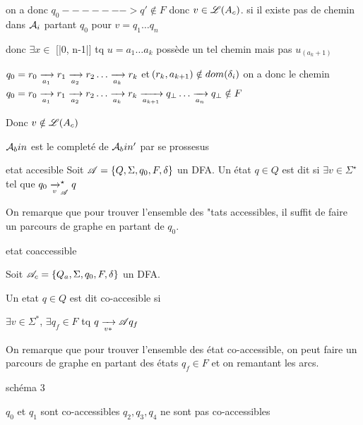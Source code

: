 \begin{nproof}
\begin{enumerate}
            on a donc $q_0 -------> q' \notin F $ donc $v \in \mathscr{L}(A_c)$.
            \itt si il existe pas de chemin dans $\mathcal{A}_i$ partant $q_0$ pour $v=q_1 \dots q_n$
        
        donc $\exists x \in $ [|0, n-1|] tq $u=a_1 \dots a_k$ possède un tel chemin mais pas $u_(a_k+1)$
        \end{enumerate}
        
        $q_0 = r_0 \lima{a_1} r_1 \lima{a_2} r_2 \dots \lima{a_k} r_k$ et $\!\left(r_k, a_{k+1}\right) \notin dom \!\left(\delta_i\right)$
        on a donc le chemin
        $q_0 = r_0 \lima{a_1} r_1 \lima{a_2} r_2 \dots \lima{a_k} r_k \lima{a_{k+1}} q_\bot \dots \lima{a_n} q_\bot \notin F$
            
        
        Donc $v \notin \mathscr{L}(A_c)$
    \end{nproof}
    
    
    
    \begin{example}{}{}
        $\mathcal{A}_bin$ est le completé de $\mathcal{A}_bin'$
        par se prossesus 
        
    \end{example}
    
    \begin{definition}{etat accesible}{}
        Soit $\mathscr{A} = \left\{Q, \Sigma, q_0, F, \delta\right\}$ un DFA.
        Un état $q \in Q$ est dit  si $\exists v \in \Sigma^\star$ tel que $q_0 \lima{v}_\bsA^\star q$
    \end{definition}
    
    On remarque que pour trouver l'ensemble des "tats accessibles, il suffit de faire un parcours de graphe en partant de $q_0$.
    
    \begin{definition}{etat coaccessible}{}
        
        Soit $\mathscr{A}_c = \left\{Q_a, \Sigma, q_0, F, \delta\right\}$ un DFA.
        
        Un etat $q\in Q$ est dit co-accesible si 
        
        $\exists v \in \Sigma^*$, $\exists q_f \in F $ tq $ q \lima{v *}{\bsA} q_f$
        
    \end{definition}
    
    On remarque que pour trouver l'ensemble des état co-accessible, on peut faire un parcours de graphe en partant des états $q_f \in F $ et on remantant les arcs.
    
    \begin{example}{}{}
        \text{}\newline
        schéma 3 \newline
        
        \begin{enumerate}
            \itt $q_0$ et $q_1$ sont co-accessibles
            \itt $q_2, q_3, q_4$ ne sont pas co-accessibles
        \end{enumerate}
    \end{example}
    
